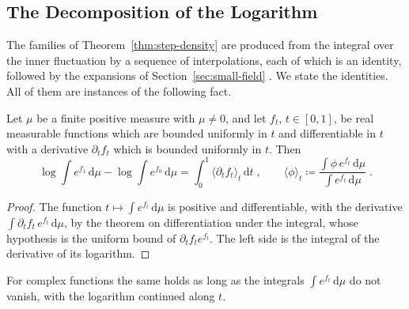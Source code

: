 \documentclass[11pt]{preprint}
\newcommand{\dd}{\mathrm{d}}
\numberwithin{equation}{section}
\begin{document}
\subsection{The Decomposition of the Logarithm}\label{sec:step-logarithm}

The families of Theorem~\ref{thm:step-density} are produced from the integral over the inner fluctuation by a sequence of interpolations, each of which is an identity, followed by the expansions of Section~\ref{sec:small-field} \cite[(3.25)--(3.42)]{BalabanCRE}. We state the identities. All of them are instances of the following fact.

\begin{lemma}[Interpolation]\label{lem:interpolation}
Let $\mu$ be a finite positive measure with $\mu \neq 0$, and let $f_t$, $t \in [0, 1]$, be real measurable functions which are bounded uniformly in $t$ and differentiable in $t$ with a derivative $\partial_tf_t$ which is bounded uniformly in $t$. Then
\begin{equation}\label{eq:interpolation}
    \log\int e^{f_1}\,\dd\mu - \log\int e^{f_0}\,\dd\mu = \int_0^1\langle\partial_tf_t\rangle_t\,\dd t\;,
    \qquad
    \langle\phi\rangle_t \coloneqq \frac{\int\phi\,e^{f_t}\,\dd\mu}{\int e^{f_t}\,\dd\mu}\;.
\end{equation}
\end{lemma}

\begin{proof}
The function $t \mapsto \int e^{f_t}\,\dd\mu$ is positive and differentiable, with the derivative $\int\partial_tf_t\,e^{f_t}\,\dd\mu$, by the theorem on differentiation under the integral, whose hypothesis is the uniform bound of $\partial_tf_te^{f_t}$. The left side is the integral of the derivative of its logarithm.
\end{proof}

For complex functions the same holds as long as the integrals $\int e^{f_t}\,\dd\mu$ do not vanish, with the logarithm continued along $t$.
\end{document}
